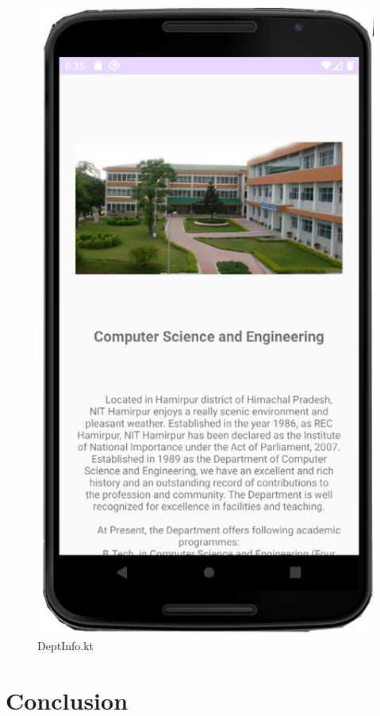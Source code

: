 \documentclass[11pt,a4paper]{report}
\begin{document}
\begin{figure}[H]
\begin{minipage}[b]{0.3\textwidth}
      \includegraphics[width=\textwidth]{./img/PREVIEW2.png}
      \caption{DeptInfo.kt}
    \end{minipage}
  \end{figure}


\chapter{Conclusion}
\end{document}
